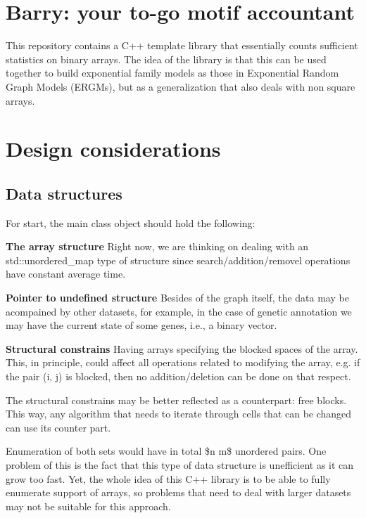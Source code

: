 \section*{Barry\+: your to-\/go motif accountant}

This repository contains a C++ template library that essentially counts sufficient statistics on binary arrays. The idea of the library is that this can be used together to build exponential family models as those in Exponential Random Graph Models (E\+R\+G\+Ms), but as a generalization that also deals with non square arrays.

\section*{Design considerations}

\subsection*{Data structures}

For start, the main class object should hold the following\+:


\begin{DoxyItemize}
\item {\bfseries The array structure} Right now, we are thinking on dealing with an {\ttfamily std\+::unordered\+\_\+map} type of structure since search/addition/removel operations have constant average time.
\item {\bfseries Pointer to undefined structure} Besides of the graph itself, the data may be acompained by other datasets, for example, in the case of genetic annotation we may have the current state of some genes, i.\+e., a binary vector.
\item {\bfseries Structural constrains} Having arrays specifying the blocked spaces of the array. This, in principle, could affect all operations related to modifying the array, e.\+g. if the pair {\ttfamily (i, j)} is blocked, then no addition/deletion can be done on that respect.

The structural constrains may be better reflected as a counterpart\+: free blocks. This way, any algorithm that needs to iterate through cells that can be changed can use its counter part.

Enumeration of both sets would have in total \$n  m\$ unordered pairs. One problem of this is the fact that this type of data structure is unefficient as it can grow too fast. Yet, the whole idea of this C++ library is to be able to fully enumerate support of arrays, so problems that need to deal with larger datasets may not be suitable for this approach.
\end{DoxyItemize}

